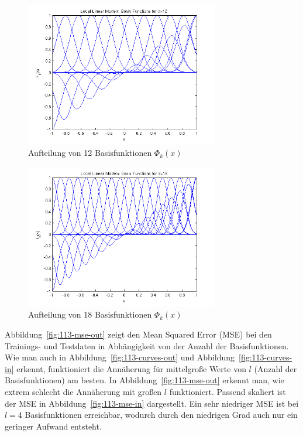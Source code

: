 \begin{figure}[h!]
  \centering
  \includegraphics[width=0.75\textwidth]{./figures/1_1_3_basis_12.png}
  \caption{Aufteilung von 12 Basisfunktionen $\Phi_k(x)$}
  \label{fig:113-basis-12}
\end{figure}

\begin{figure}[h!]
  \centering
  \includegraphics[width=0.75\textwidth]{./figures/1_1_3_basis_18.png}
  \caption{Aufteilung von 18 Basisfunktionen $\Phi_k(x)$}
  \label{fig:113-basis-18}
\end{figure}

Abbildung~\ref{fig:113-mse-out} zeigt den Mean Squared Error (MSE) bei den Trainings- und Testdaten in Abhängigkeit von der Anzahl der Basisfunktionen. Wie man auch in Abbildung~\ref{fig:113-curves-out} und Abbildung~\ref{fig:113-curves-in} erkennt, funktioniert die Annäherung für mittelgroße Werte von $l$ (Anzahl der Basisfunktionen) am besten. In Abbildung~\ref{fig:113-mse-out} erkennt man, wie extrem schlecht die Annäherung mit großen $l$ funktioniert. Passend skaliert ist der MSE in Abbildung~\ref{fig:113-mse-in} dargestellt. Ein sehr niedriger MSE ist bei $l=4$ Basisfunktionen erreichbar, wodurch durch den niedrigen Grad auch nur ein geringer Aufwand entsteht.

